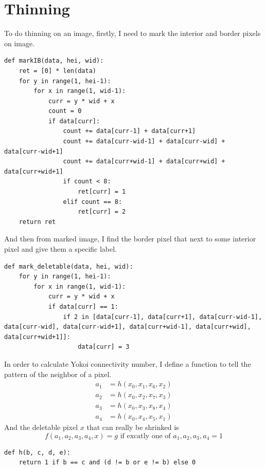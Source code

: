 \documentclass[14pt,a4paper]{extarticle}
\begin{document}
\section*{Thinning}

To do thinning on an image, firstly, I need to mark the interior and border pixels on image.
\begin{lstlisting}
def markIB(data, hei, wid):
	ret = [0] * len(data)
	for y in range(1, hei-1):
		for x in range(1, wid-1):
			curr = y * wid + x
			count = 0
			if data[curr]:
				count += data[curr-1] + data[curr+1]
				count += data[curr-wid-1] + data[curr-wid] + data[curr-wid+1]
				count += data[curr+wid-1] + data[curr+wid] + data[curr+wid+1]
				if count < 8:
					ret[curr] = 1
				elif count == 8:
					ret[curr] = 2
	return ret
\end{lstlisting}

And then from marked image, I find the border pixel that next to some interior pixel and give them a specific label.
\begin{lstlisting}
def mark_deletable(data, hei, wid):
	for y in range(1, hei-1):
		for x in range(1, wid-1):
			curr = y * wid + x
			if data[curr] == 1:
				if 2 in [data[curr-1], data[curr+1], data[curr-wid-1], data[curr-wid], data[curr-wid+1], data[curr+wid-1], data[curr+wid], data[curr+wid+1]]:
					data[curr] = 3
\end{lstlisting}

In order to calculate Yokoi connectivity number, I define a function to tell the pattern of the neighbor of a pixel.
\begin{align*}
a_1 &= h(x_0, x_1, x_6, x_2)\\
a_2 &= h(x_0, x_2, x_7, x_3)\\
a_3 &= h(x_0, x_3, x_8, x_4)\\
a_4 &= h(x_0, x_4, x_5, x_1)
\end{align*}
And the deletable pixel $x$ that can really be shrinked is
\[ f(a_1, a_2, a_3, a_4, x) = g \text{ if excatly one of } a_1,a_2,a_3,a_4=1 \]

\begin{lstlisting}
def h(b, c, d, e):
	return 1 if b == c and (d != b or e != b) else 0
\end{lstlisting}
\end{document}
